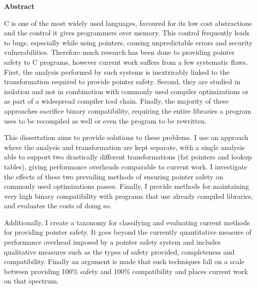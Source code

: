 \documentclass[a4paper,12pt,twoside,openright]{report}
\begin{document}
\pagestyle{empty}
\singlespacing

\onehalfspacing

\singlespacing
\newpage
{\Huge \bf Abstract}
\vspace{24pt} 

C is one of the most widely used languages, favoured for its low cost abstractions and the control it gives programmers over memory.
This control frequently leads to bugs, especially while using pointers, causing unpredictable errors and security vulnerabilities.
Therefore much research has been done to providing pointer safety to C programs, however current work suffers from a few systematic flaws.
First, the analysis performed by such systems is inextricably linked to the transformation required to provide pointer safety.
Second, they are studied in isolation and not in combination with commonly used compiler optimizations or as part of a widespread compiler tool chain.
Finally, the majority of these approaches sacrifice binary compatibility, requiring the entire libraries a program uses to be recompiled as well or even the program to be rewritten.

This dissertation aims to provide solutions to these problems.
I use an approach where the analysis and transformation are kept separate, with a single analysis able to support two drastically different transformations (fat pointers and lookup tables), giving performance overheads comparable to current work.
I investigate the effects of these two prevailing methods of ensuring pointer safety on commonly used optimizations passes.
Finally, I provide methods for maintaining very high binary compatibility with programs that use already compiled libraries, and evaluates the costs of doing so.

Additionally, I create a taxonomy for classifying and evaluating current methods for providing pointer safety.
It goes beyond the currently quantitative measure of performance overhead imposed by a pointer safety system and includes qualitative measures such as the types of safety provided, completeness and compatibility.
Finally an argument is made that such techniques fall on a scale between providing 100\% safety and 100\% compatibility and places current work on that spectrum.

\newpage
\vspace*{\fill}

\setcounter{page}{0}
\pagestyle{plain}
\tableofcontents
\listoffigures
\listoftables
\end{document}
